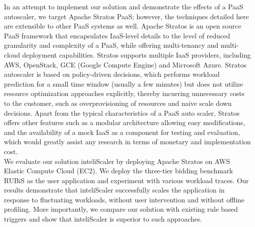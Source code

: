 In an attempt to implement our solution and demonstrate the effects of a PaaS autoscaler, we target Apache Stratos PaaS; however, the techniques detailed here are extensible to other PaaS systems as well. Apache Stratos is an open source PaaS framework that encapsulates IaaS-level details to the level of reduced granularity and complexity of a PaaS, while offering multi-tenancy and multi-cloud deployment capabilities. Stratos supports multiple IaaS providers, including AWS, OpenStack, GCE (Google Compute Engine) and Microsoft Azure\cite{website:stratos}. Stratos autoscaler is based on policy-driven decisions, which performs workload prediction for a small time window (usually a few minutes) but does not utilize resource optimization approaches explicitly, thereby incurring unnecessary costs to the customer, such as overprovisioning of resources and naive scale down decisions. Apart from the typical characteristics of a PaaS auto scaler, Stratos offers other features such as a modular architecture allowing easy modifications, and the availability of a mock IaaS as a component for testing and evaluation, which would greatly assist any research in terms of monetary and implementation cost.\\

We evaluate our solution inteliScaler by deploying  Apache Stratos on AWS Elastic Compute Cloud (EC2). We deploy the three-tier bidding benchmark RUBiS as the user application and experiment with various workload traces. Our results demonstrate that inteliScaler successfully scales the application in response to fluctuating workloads, without user intervention and without offline profiling. More importantly, we compare our solution with existing rule based triggers and show that inteliScaler is superior to such approaches.\\
